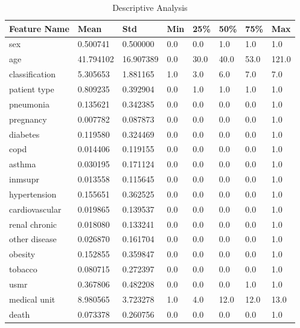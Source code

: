 \documentclass[
  journal=medium,
  manuscript=Report,
  year=2023,
  volume=37,
]{cup-journal}
\begin{document}
\begin{table}[hbt!]
    \begin{threeparttable}
    \caption{Descriptive Analysis}
    \label{attribute3}
    \begin{tabular}{llllllll}
        \toprule
        \headrow Feature Name & Mean & Std & Min & 25\% & 50\% & 75\% & Max\\
        \midrule
        sex & 0.500741 & 0.500000 & 0.0 & 0.0 & 1.0	& 1.0 & 1.0\\ 
        \midrule
        age & 41.794102	& 16.907389	& 0.0 & 30.0 & 40.0 & 53.0 & 121.0\\ 
        \midrule
        classification & 5.305653 & 1.881165 & 1.0 & 3.0 & 6.0 & 7.0 & 7.0\\ 
        \midrule
        patient type & 0.809235 & 0.392904 & 0.0 & 1.0 & 1.0 & 1.0 & 1.0\\ 
        \midrule
        pneumonia & 0.135621 & 0.342385 & 0.0 & 0.0 & 0.0 & 0.0 & 1.0\\ 
        \midrule
        pregnancy & 0.007782 & 0.087873 & 0.0 & 0.0 & 0.0 & 0.0 & 1.0\\ 
        \midrule
        diabetes & 0.119580 & 0.324469 & 0.0 & 0.0 & 0.0 & 0.0 & 1.0\\ 
        \midrule
        copd & 0.014406 & 0.119155 & 0.0 & 0.0 & 0.0 & 0.0 & 1.0\\ 
        \midrule
        asthma & 0.030195 & 0.171124 & 0.0 & 0.0 & 0.0 & 0.0 & 1.0\\ 
        \midrule
        inmsupr & 0.013558 & 0.115645 & 0.0 & 0.0 & 0.0 & 0.0 & 1.0\\ 
        \midrule
        hypertension &  0.155651 & 0.362525 & 0.0 & 0.0 & 0.0 & 0.0 & 1.0\\ 
        \midrule
        cardiovascular &  0.019865 & 0.139537 & 0.0 & 0.0 & 0.0 & 0.0 & 1.0\\ 
        \midrule
        renal chronic &  0.018080 & 0.133241 & 0.0 & 0.0 & 0.0 & 0.0 & 1.0\\ 
        \midrule
        other disease & 0.026870 & 0.161704 & 0.0 & 0.0 & 0.0 & 0.0 & 1.0\\ 
        \midrule
        obesity &  0.152855	& 0.359847 & 0.0 & 0.0 & 0.0 & 0.0 & 1.0\\ 
        \midrule
        tobacco &  0.080715	& 0.272397 & 0.0 & 0.0 & 0.0 & 0.0 & 1.0\\ 
        \midrule
        usmr &  0.367806 & 0.482208	& 0.0 & 0.0 & 0.0 & 1.0 & 1.0\\ 
        \midrule
        medical unit & 8.980565 & 3.723278 & 1.0 & 4.0 & 12.0 & 12.0 & 13.0\\ 
        \midrule
        death &  0.073378 & 0.260756 & 0.0 & 0.0 & 0.0 & 0.0 & 1.0\\ 
        \bottomrule 
    \end{tabular}
\end{threeparttable}
\end{table}
\end{document}
